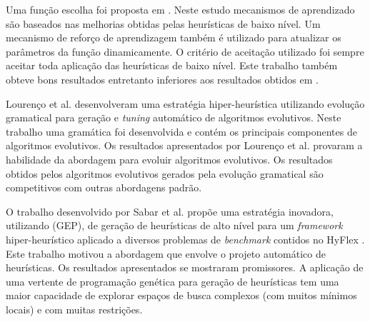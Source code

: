Uma função escolha foi proposta em \cite{drake2012improved}. Neste estudo mecanismos de aprendizado são baseados nas melhorias obtidas pelas heurísticas de baixo nível. Um mecanismo de reforço de aprendizagem também é utilizado para atualizar os parâmetros da função dinamicamente. O critério de aceitação utilizado foi sempre aceitar toda aplicação das heurísticas de baixo nível. Este trabalho também obteve bons resultados entretanto inferiores aos resultados obtidos em \cite{misir2012intelligent}.




Lourenço et al. \cite{lourencco2012evolving} desenvolveram uma estratégia hiper-heurística utilizando evolução gramatical para geração e \textit{tuning} automático de algoritmos evolutivos. Neste trabalho uma gramática foi desenvolvida e contém os principais componentes de algoritmos evolutivos. Os resultados apresentados por Lourenço et al. provaram a habilidade da abordagem para evoluir algoritmos evolutivos. Os resultados obtidos pelos algoritmos evolutivos gerados pela evolução gramatical são competitivos com outras abordagens padrão. 


O trabalho desenvolvido por Sabar et al. \cite{sabar2015automatic} propõe uma estratégia inovadora, utilizando  (GEP), de geração de heurísticas de alto nível para um \textit {framework} hiper-heurístico aplicado a diversos problemas de \textit{benchmark} contidos no  HyFlex \cite{ochoa2012hyflex}. Este trabalho motivou a abordagem que envolve o projeto automático de heurísticas. Os resultados apresentados se mostraram  promissores. A aplicação de uma vertente de programação genética para geração de heurísticas tem uma maior capacidade de explorar espaços de busca complexos (com muitos mínimos locais) e com muitas restrições.










